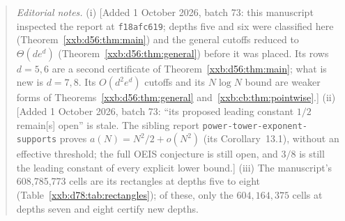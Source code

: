 \documentclass[11pt,a4paper]{article}
\numberwithin{equation}{section}
\theoremstyle{definition}
\theoremstyle{remark}
\theoremstyle{plain}
\newcommand{\sibPTE}{\texttt{power-\allowbreak{}tower-\allowbreak{}exponent-\allowbreak{}supports}}
\begin{document}
\begin{quote}
\smallskip
\emph{Editorial notes.}  (i) [Added 1 October 2026, batch 73: this
manuscript inspected the report at \texttt{f18afc619}; depths five and six
were classified here (Theorem~\ref{xxb:d56:thm:main}) and the general
cutoffs reduced to $\Theta(de^d)$ (Theorem~\ref{xxb:d56:thm:general}) before
it was placed.  Its rows $d=5,6$ are a second certificate of
Theorem~\ref{xxb:d56:thm:main}; what is new is $d=7,8$.  Its $O(d^2e^d)$
cutoffs and its $N\log N$ bound are weaker forms of
Theorems~\ref{xxb:d56:thm:general} and~\ref{xxb:cb:thm:pointwise}.]
(ii) [Added 1 October 2026, batch 73: ``its proposed leading constant $1/2$
remain[s] open'' is stale.  The sibling report \sibPTE{} proves
$a(N)=N^2/2+o(N^2)$ (its Corollary~13.1), without an effective threshold;
the full OEIS conjecture is still open, and $3/8$ is still the leading
constant of every explicit lower bound.]
(iii) The manuscript's 608,785,773 cells are its rectangles at depths five to
eight (Table~\ref{xxb:d78:tab:rectangles}); of these, only the
$604{,}164{,}375$ cells at depths seven and eight certify new depths.
\end{quote}
\end{document}
